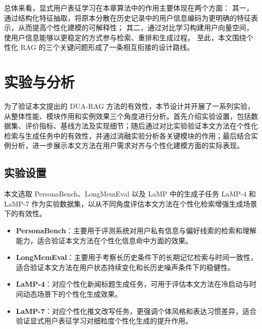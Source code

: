 总体来看，显式用户表征学习在本章算法中的作用主要体现在两个方面：
其一，通过结构化特征抽取，将原本分散在历史记录中的用户信息编码为更明确的特征表示，从而提高个性化建模的可解释性；
其二，通过对比学习构建用户向量空间，使用户信息能够以更稳定的方式参与检索、重排和生成过程。
至此，本文围绕个性化 RAG 的三个关键问题形成了一条相互衔接的设计路线。

\section{实验与分析}

为了验证本文提出的 DUA-RAG 方法的有效性，本节设计并开展了一系列实验，从整体性能、模块作用和实例效果三个角度进行分析。首先介绍实验设置，包括数据集、评价指标、基线方法及实现细节；随后通过对比实验验证本文方法在个性化检索与生成任务中的有效性，并通过消融实验分析各关键模块的作用；最后结合实例分析，进一步展示本文方法在用户需求对齐与个性化建模方面的实际表现。

\subsection{实验设置}

\vspace{0.5em}


\vspace{0.5em}

本文选取 PersonaBench、LongMemEval 以及 LaMP 中的生成子任务 LaMP-4 和 LaMP-7 作为实验数据集，以从不同角度评估本文方法在个性化检索增强生成场景下的有效性。

\begin{itemize}
    \item \textbf{PersonaBench}\cite{tanPersonaBenchEvaluatingAI2025}：主要用于评测系统对用户私有信息与偏好线索的检索和理解能力，适合验证本文方法在个性化信息命中方面的效果。
    
    \item \textbf{LongMemEval}\cite{wuLongMemEvalBenchmarkingChat2025}：主要用于考察长历史条件下的长期记忆检索与时间一致性，适合验证本文方法在用户状态持续变化和长历史噪声条件下的稳健性。
    
    \item \textbf{LaMP-4}\cite{salemiLaMPWhenLarge2024}：对应个性化新闻标题生成任务，可用于评估本文方法在冷启动与时间动态场景下的个性化生成效果。
    
    \item \textbf{LaMP-7}\cite{salemiLaMPWhenLarge2024}：对应个性化推文改写任务，更强调个体风格和表达习惯差异，适合验证显式用户表征学习对细粒度个性化生成的提升作用。
\end{itemize}

